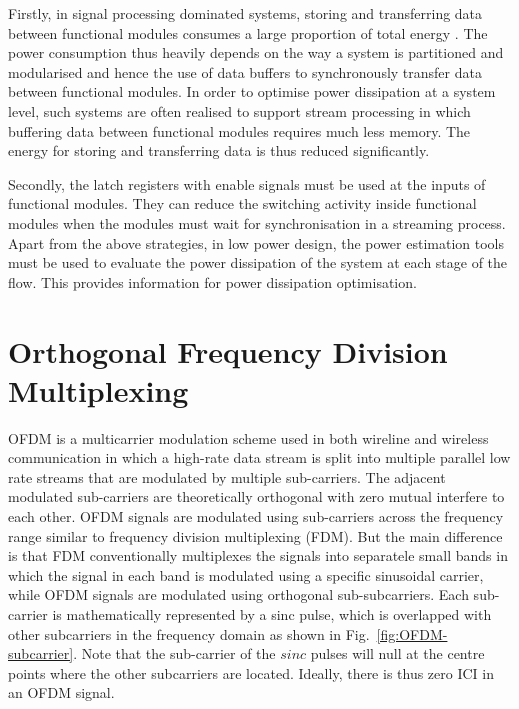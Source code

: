 Firstly, in signal processing dominated systems, storing and transferring data between functional modules consumes a large proportion of total energy \cite{Liu2009}.
The power consumption thus heavily depends on the way a system is partitioned and modularised and hence the use of data buffers to synchronously transfer data between functional modules.
In order to optimise power dissipation at a system level, such systems are often realised to support stream processing in which buffering data between functional modules requires much less memory.
The energy for storing and transferring data is thus reduced significantly.

Secondly, the latch registers with enable signals must be used at the inputs of functional modules.
They can reduce the switching activity inside functional modules when the modules must wait for synchronisation in a streaming process.
Apart from the above strategies, in low power design, the power estimation tools must be used to evaluate the power dissipation of the system at each stage of the flow. 
This provides information for power dissipation optimisation. 

\section{Orthogonal Frequency Division Multiplexing}

OFDM is a multicarrier modulation scheme used in both wireline and wireless communication in which a high-rate data stream is split into multiple parallel low rate streams that are modulated by multiple sub-carriers.
The adjacent modulated sub-carriers are theoretically orthogonal with zero mutual interfere to each other.
OFDM signals are modulated using sub-carriers across the frequency range similar to frequency division multiplexing (FDM). 
But the main difference is that FDM conventionally multiplexes the signals into separatele small bands in which the signal in each band is modulated using a specific sinusoidal carrier, while OFDM signals are modulated using orthogonal sub-subcarriers. 
Each sub-carrier is mathematically represented by a sinc pulse, which is overlapped with other subcarriers in the frequency domain as shown in Fig.~\ref{fig:OFDM-subcarrier}.
Note that the sub-carrier of the $sinc$ pulses will null at the centre points where the other subcarriers are located. Ideally, there is thus zero ICI in an OFDM signal. 

